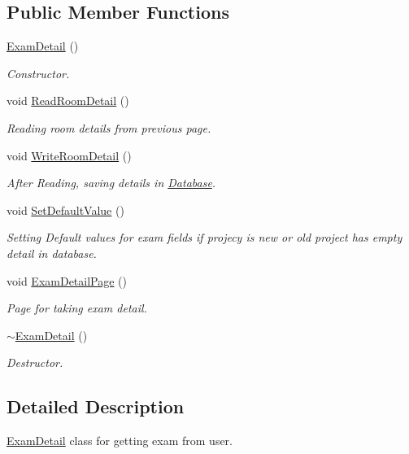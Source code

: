 \subsection*{\-Public \-Member \-Functions}
\begin{DoxyCompactItemize}
\item 
\hyperlink{classExamDetail_ad555c8a79c821f4e9e75c9b882366991}{\-Exam\-Detail} ()
\begin{DoxyCompactList}\small\item\em \-Constructor. \end{DoxyCompactList}\item 
void \hyperlink{classExamDetail_a460c5736a52aa73ee2627a322d9022f8}{\-Read\-Room\-Detail} ()
\begin{DoxyCompactList}\small\item\em \-Reading room details from previous page. \end{DoxyCompactList}\item 
void \hyperlink{classExamDetail_a51cb1af0e7d6f077aa662b120fd7aec2}{\-Write\-Room\-Detail} ()
\begin{DoxyCompactList}\small\item\em \-After \-Reading, saving details in \hyperlink{classDatabase}{\-Database}. \end{DoxyCompactList}\item 
void \hyperlink{classExamDetail_a3f17d1b2a87cf9530ce2dc5c65244165}{\-Set\-Default\-Value} ()
\begin{DoxyCompactList}\small\item\em \-Setting \-Default values for exam fields if projecy is new or old project has empty detail in database. \end{DoxyCompactList}\item 
void \hyperlink{classExamDetail_aa5bccd1f578e6149ad212206e95d9d57}{\-Exam\-Detail\-Page} ()
\begin{DoxyCompactList}\small\item\em \-Page for taking exam detail. \end{DoxyCompactList}\item 
\hyperlink{classExamDetail_ac613efeb54bd3ddc025b6665e23eb3b0}{$\sim$\-Exam\-Detail} ()
\begin{DoxyCompactList}\small\item\em \-Destructor. \end{DoxyCompactList}\end{DoxyCompactItemize}


\subsection{\-Detailed \-Description}
\hyperlink{classExamDetail}{\-Exam\-Detail} class for getting exam from user. 

